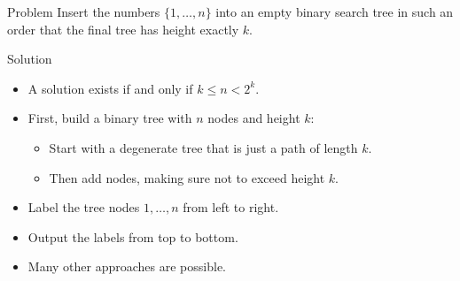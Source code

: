\begin{slide}
  \begin{block}{Problem}
    Insert the numbers $\{1,\dots,n\}$ into an empty binary search
    tree in such an order that the final tree has height exactly $k$.
  \end{block}
  \pause
  \begin{block}{Solution}
    \begin{itemize}
      \item A solution exists if and only if $k \le n < 2^k$.
      \item First, build a binary tree with $n$ nodes and height $k$:
        \begin{itemize}
          \item Start with a degenerate tree that is just a path of
            length $k$.
          \item Then add nodes, making sure not to exceed height $k$.
        \end{itemize}
      \item Label the tree nodes $1,\dots,n$ from left to right.
      \item Output the labels from top to bottom.
      \item Many other approaches are possible.
    \end{itemize}
  \end{block}
\end{slide}
